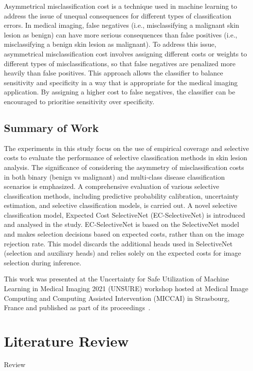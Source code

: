 Asymmetrical misclassification cost is a technique used in machine learning to address the issue of unequal consequences for different types of classification errors. In medical imaging, false negatives (i.e., misclassifying a malignant skin lesion as benign) can have more serious consequences than false positives (i.e., misclassifying a benign skin lesion as malignant). To address this issue, asymmetrical misclassification cost involves assigning different costs or weights to different types of misclassifications, so that false negatives are penalized more heavily than false positives. This approach allows the classifier to balance sensitivity and specificity in a way that is appropriate for the medical imaging application. By assigning a higher cost to false negatives, the classifier can be encouraged to prioritise sensitivity over specificity.


\subsection{Summary of Work}
\label{subsec:selective_summary_of_work}
The experiments in this study focus on the use of empirical coverage and selective costs to evaluate the performance of selective classification methods in skin lesion analysis. The significance of considering the asymmetry of misclassification costs in both binary (benign vs malignant) and multi-class disease classification scenarios is emphasized. A comprehensive evaluation of various selective classification methods, including predictive probability calibration, uncertainty estimation, and selective classification models, is carried out. A novel selective classification model, Expected Cost SelectiveNet (EC-SelectiveNet) is introduced and analysed in the study. EC-SelectiveNet is based on the SelectiveNet model~\cite{selective2019geifman} and makes selection decisions based on expected costs, rather than on the image rejection rate. This model discards the additional heads used in SelectiveNet (selection and auxiliary heads) and relies solely on the expected costs for image selection during inference.

This work was presented at the Uncertainty for Safe Utilization of Machine Learning in Medical Imaging 2021 (UNSURE) workshop hosted at Medical Image Computing and Computing Assisted Intervention (MICCAI) in Strasbourg, France and published as part of its proceedings~\citep{carse2021robust}.



\section{Literature Review}
\label{sec:selective_review}
Review




